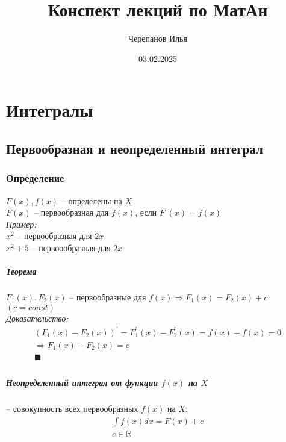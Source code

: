 \documentclass[12pt, fleqn]{book}
\title{Конспект лекций по МатАн}
\date{03.02.2025}
\author{Черепанов Илья}
\begin{document}
	\maketitle
	\tableofcontents{}
	\chapter{Интегралы}
	\section{Первообразная и неопределенный интеграл}
	\subsection{Определение}
	$F(x), f(x)$ -- определены на $X$\\
	$F(x)$ -- первообразная для $f(x)$, если $F^\prime(x)=f(x)$\\
	\textit{Пример:}\\
	$x^2$ -- первообразная для $2x$\\
	$x^2+5$ -- первоообразная для $2x$
	\paragraph{Теорема} $F_1(x), F_2(x)$ -- первообразные для $f(x) \Rightarrow F_1(x)=F_2(x)+c$ $(c=const)$\\
	\textit{Доказательство:}
	\begin{multline*}
		\left(F_1(x) - F_2(x)\right)^\prime = F_1^\prime(x) - F_2^\prime(x)=f(x)-f(x)=0\\
		\Rightarrow F_1(x)-F_2(x) = c\\
		\blacksquare\\
	\end{multline*}
	\paragraph{Неопределенный интеграл от функции $f(x)$ на $X$} -- совокупность всех первообразных $f(x)$ на $X$.
	\begin{multline*}
		\int f(x)dx=F(x)+c\\
		c\in \mathbb{R}\\
	\end{multline*}
\end{document}
